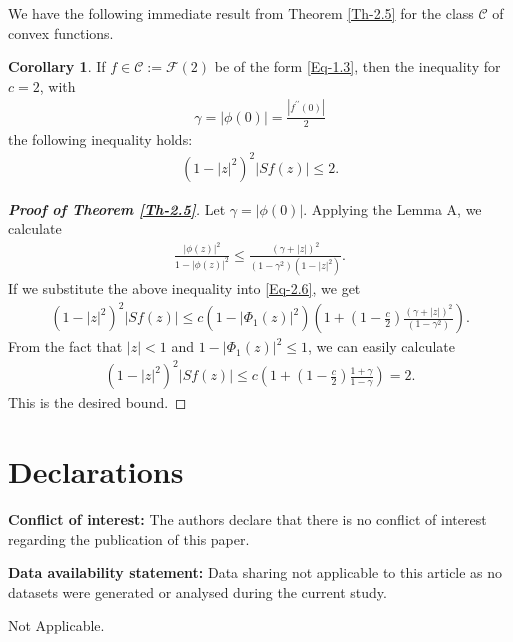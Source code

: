 \documentclass[a4paper,12pt]{amsart}
\theoremstyle{plain}
\theoremstyle{definition}
\newtheorem{cor}{Corollary}[section]
\theoremstyle{plain}
\begin{document}
We have the following immediate result from Theorem \ref{Th-2.5} for the class $\mathcal{C}$ of convex functions.
\begin{cor}
	If $f\in \mathcal{C} := \mathcal{F}(2)$ be of the form \eqref{Eq-1.3}, then the inequality for $c=2$, with
	\begin{align*}
		\gamma=|\phi(0)|=\frac{|f^{\prime\prime}(0)|}{2}
	\end{align*}
the following inequality holds:
	\begin{align*}
		(1-|z|^2)^2|Sf(z)|\leq 2.
	\end{align*}
\end{cor}
\begin{proof}[\bf Proof of Theorem \ref{Th-2.5}]
	Let $\gamma=|\phi(0)|$. Applying the Lemma A, we  calculate
	\begin{align*}
		\frac{|\phi(z)|^2}{1-|\phi(z)|^2}\leq\frac{(\gamma+|z|)^2}{(1-\gamma^2)(1-|z|^2)}.
	\end{align*}
	If we substitute the above inequality into \eqref{Eq-2.6}, we get
	\begin{align*}
		(1-|z|^2)^2|Sf(z)|\leq c(1-|\Phi_1(z)|^2)\left(1+\left(1-\frac{c}{2}\right)\frac{(\gamma+|z|)^2}{(1-\gamma^2)}\right).
	\end{align*}
	From the fact that $|z|<1$ and  $1-|\Phi_1(z)|^2\leq1$, we can easily calculate 
	\begin{align*}
		(1-|z|^2)^2|Sf(z)|\leq c\left(1+\left(1-\frac{c}{2}\right)\frac{1+\gamma}{1-\gamma}\right)=2.
	\end{align*}
	This is the desired bound.
\end{proof}

 
 




\section{\bf Declarations}
\noindent\textbf{Conflict of interest:} The authors declare that there is no conflict  of interest regarding the publication of this paper.\vspace{2mm}

\noindent\textbf{Data availability statement:}  Data sharing not applicable to this article as no datasets were generated or analysed during the current study.\vspace{2mm}

 Not Applicable.\vspace{2mm}
\end{document}
